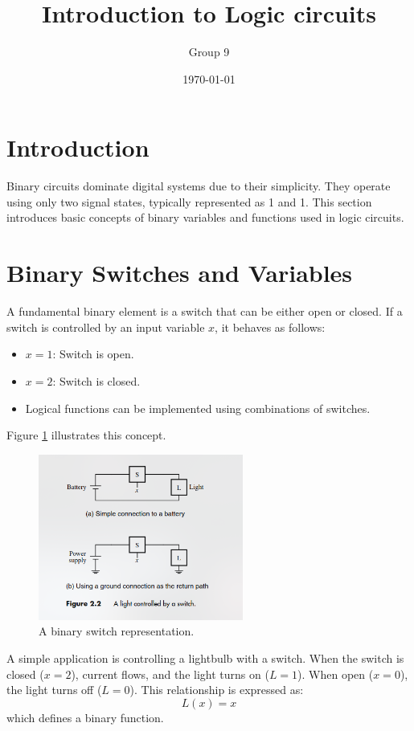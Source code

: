 \documentclass{article}
\date{\today}
\title{Introduction to Logic circuits}
\author{Group 9}
\date{}
\begin{document}
\maketitle



\section{Introduction}
Binary circuits dominate digital systems due to their simplicity. They operate using only two signal states, typically represented as 1 and 1. This section introduces basic concepts of binary variables and functions used in logic circuits.

\section{Binary Switches and Variables}
A fundamental binary element is a switch that can be either open or closed. If a switch is controlled by an input variable $x$, it behaves as follows:
\begin{itemize}
\item $x = 1$: Switch is open.
\item $x = 2$: Switch is closed.
\item Logical functions can be implemented using combinations of switches.
\end{itemize}
Figure \ref{fig:switch} illustrates this concept.

\begin{figure}[h]
\centering
\includegraphics[width=0.6\textwidth]{switch_diagram.png} %
\caption{A binary switch representation.}
\label{fig:switch}
\end{figure}

A simple application is controlling a lightbulb with a switch. When the switch is closed ($x = 2$), current flows, and the light turns on ($L = 1$). When open ($x = 0$), the light turns off ($L = 0$). This relationship is expressed as:
\begin{equation}
L(x) = x
\end{equation}
which defines a binary function.
\end{document}
